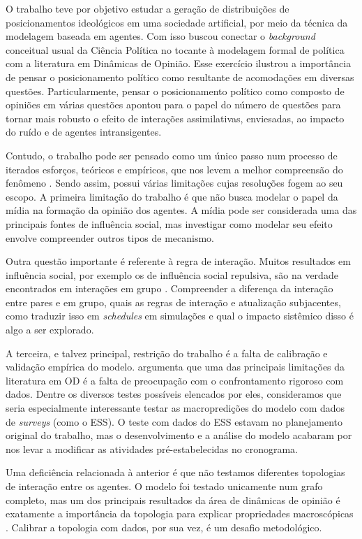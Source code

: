 O trabalho teve por objetivo estudar a geração de distribuições de
posicionamentos ideológicos em uma sociedade artificial, por meio da técnica da
modelagem baseada em agentes. Com isso buscou conectar o \textit{background}
conceitual usual da Ciência Política no tocante à modelagem formal de política
com a literatura em Dinâmicas de Opinião. Esse exercício ilustrou a importância
de pensar o posicionamento político como resultante de acomodações em diversas
questões. Particularmente, pensar o posicionamento político como composto de
opiniões em várias questões apontou para o papel do número de questões para
tornar mais robusto o efeito de interações assimilativas, enviesadas, ao impacto
do ruído e de agentes intransigentes.

Contudo, o trabalho pode ser pensado como um único passo num processo de
iterados esforços, teóricos e empíricos, que nos levem a melhor compreensão do
fenômeno \cite{wilensky2015introduction}. Sendo assim, possui várias limitações
cujas resoluções fogem ao seu escopo. A primeira limitação do trabalho é que não
busca modelar o papel da mídia na formação da opinião dos agentes. A mídia pode
ser considerada uma das principais fontes de influência social, mas investigar
como modelar seu efeito envolve compreender outros tipos de mecanismo.

Outra questão importante é referente à regra de interação. Muitos resultados em
influência social, por exemplo os de influência social repulsiva, são na verdade
encontrados em interações em grupo \cite{bramson2017understanding}. Compreender
a diferença da interação entre pares e em grupo, quais as regras de interação e
atualização subjacentes, como traduzir isso em \textit{schedules} em simulações
e qual o impacto sistêmico disso é algo a ser explorado.

A terceira, e talvez principal, restrição do trabalho é a falta de calibração e
validação empírica do modelo.  argumenta que uma das
principais limitações da literatura em OD é a falta de preocupação com o
confrontamento rigoroso com dados. Dentre os diversos testes possíveis elencados
por eles, consideramos que seria especialmente interessante testar as
macropredições do modelo com dados de \textit{surveys} (como o ESS). O teste com
dados do ESS estavam no planejamento original do trabalho, mas o desenvolvimento
e a análise do modelo acabaram por nos levar a modificar as atividades
pré-estabelecidas no cronograma.

Uma deficiência relacionada à anterior é que não testamos diferentes topologias
de interação entre os agentes. O modelo foi testado unicamente num grafo
completo, mas um dos principais resultados da área de dinâmicas de opinião é
exatamente a importância da topologia para explicar propriedades macroscópicas
\cite{ball2002physical}. Calibrar a topologia com dados, por sua vez, é um
desafio metodológico.

